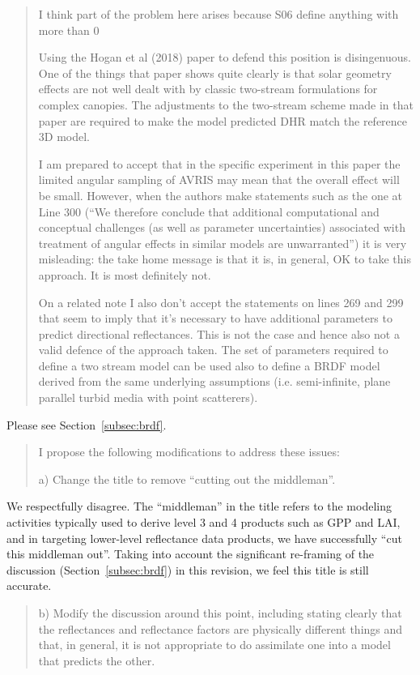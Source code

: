 \begin{quote}
  I think part of the problem here arises because S06 define anything with more than 0

  Using the Hogan et al (2018) paper to defend this position is disingenuous. One of the things that paper shows quite clearly is that solar geometry effects are not well dealt with by classic two-stream formulations for complex canopies. The adjustments to the two-stream scheme made in that paper are required to make the model predicted DHR match the reference 3D model.

  I am prepared to accept that in the specific experiment in this paper the limited angular sampling of AVRIS may mean that the overall effect will be small. However, when the authors make statements such as the one at Line 300 (“We therefore conclude that additional computational and conceptual challenges (as well as parameter uncertainties) associated with treatment of angular effects in similar models are unwarranted”) it is very misleading: the take home message is that it is, in general, OK to take this approach. It is most definitely not.

  On a related note I also don’t accept the statements on lines 269 and 299 that seem to imply that it’s necessary to have additional parameters to predict directional reflectances. This is not the case and hence also not a valid defence of the approach taken. The set of parameters required to define a two stream model can be used also to define a BRDF model derived from the same underlying assumptions (i.e. semi-infinite, plane parallel turbid media with point scatterers).
\end{quote}

Please see Section~\ref{subsec:brdf}.

\begin{quote}
  I propose the following modifications to address these issues:

  a) Change the title to remove ``cutting out the middleman''.
\end{quote}

We respectfully disagree.
The ``middleman'' in the title refers to the modeling activities typically used to derive level 3 and 4 products such as GPP and LAI,
and in targeting lower-level reflectance data products, we have successfully ``cut this middleman out''.
Taking into account the significant re-framing of the discussion (Section~\ref{subsec:brdf}) in this revision, we feel this title is still accurate.

\begin{quote}
  b) Modify the discussion around this point, including stating clearly that the reflectances and reflectance factors are physically different things and that, in general, it is not appropriate to do assimilate one into a model that predicts the other.
\end{quote}

